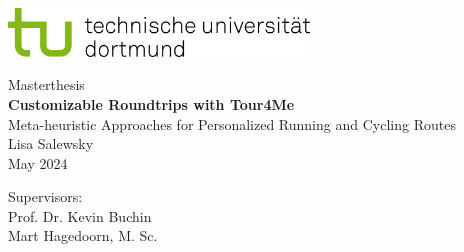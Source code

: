 \begin{titlepage}
\vspace*{-2cm}
\newlength{\links}
\setlength{\links}{-1.5cm}
\sffamily
\hspace*{\links}
\begin{minipage}{12.5cm}
\includegraphics[width=8cm]{bilder/tud_logo_rgb}
\end{minipage}

\vspace*{4cm}

\hspace*{\links}
\hspace*{-0.2cm}
\begin{minipage}{9cm}
\large
\begin{center}
{\Large Masterthesis} \\
\vspace*{1cm}
\textbf{Customizable Roundtrips with Tour4Me} \\
\normalsize{Meta-heuristic Approaches for Personalized Running and Cycling Routes}\\
\vspace*{1cm}
\large{Lisa Salewsky\\
May 2024}
\end{center}
\end{minipage}
\normalsize
\vspace*{5.5cm}


\vspace*{2.1cm}

\hspace*{\links}
\begin{minipage}[b]{5cm}
\raggedright
Supervisors: \\
Prof. Dr. Kevin Buchin\\
Mart Hagedoorn, M. Sc. \\
\end{minipage}


\end{titlepage}
